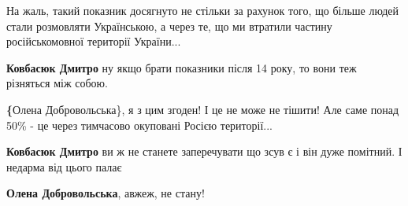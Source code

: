  

На жаль, такий показник досягнуто не стільки за рахунок того, що більше людей
стали розмовляти Українською, а через те, що ми втратили частину
російськомовної території України...

\begin{itemize}
 
\textbf{Ковбасюк Дмитро} ну якщо брати показники після 14 року, то вони теж різняться між собою.

 
\textbf\{Олена Добровольська\}, я з цим згоден! І це не може не тішити! Але саме понад 50\% - це через тимчасово окуповані Росією території...

 
\textbf{Ковбасюк Дмитро} ви ж не станете заперечувати що зсув є і він дуже помітний. І недарма від цього палає

 
\textbf{Олена Добровольська}, авжеж, не стану!
\end{itemize}

 

